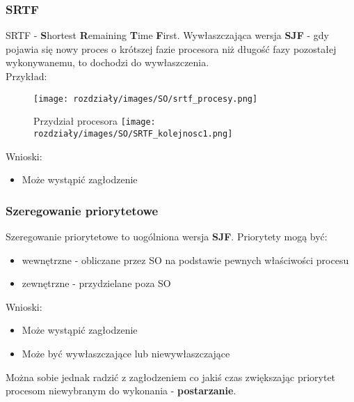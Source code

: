     
\subsubsection{SRTF}
    SRTF - \textbf{S}hortest \textbf{R}emaining \textbf{T}ime \textbf{F}irst. Wywłaszczająca wersja \textbf{SJF} - gdy pojawia się nowy proces o krótszej fazie procesora niż długość fazy pozostałej wykonywanemu, to dochodzi do wywłaszczenia. \\

    Przykład:
    \begin{figure}[!htb]
       \begin{minipage}{0.3\textwidth}
         \centering
         \texttt{[image: rozdziały/images/SO/srtf\_procesy.png]}
       \end{minipage}\hfill
       \begin{minipage}{0.5\textwidth}
         \centering
         Przydział procesora
         \texttt{[image: rozdziały/images/SO/SRTF\_kolejnosc1.png]}
       \end{minipage}
    \end{figure}

    Wnioski:
    \begin{itemize}
        \item Może wystąpić zagłodzenie
    \end{itemize}

\subsubsection{Szeregowanie priorytetowe}
    Szeregowanie priorytetowe to uogólniona wersja \textbf{SJF}. Priorytety mogą być:
    \begin{itemize}
        \item wewnętrzne - obliczane przez SO na podstawie pewnych właściwości procesu
        \item zewnętrzne - przydzielane poza SO
    \end{itemize} 

    Wnioski:
    \begin{itemize}
        \item Może wystąpić zagłodzenie
        \item Może być wywłaszczające lub niewywłaszczające
    \end{itemize}

    Można sobie jednak radzić z zagłodzeniem co jakiś czas zwiększając priorytet procesom niewybranym do wykonania - \textbf{postarzanie}.
    

